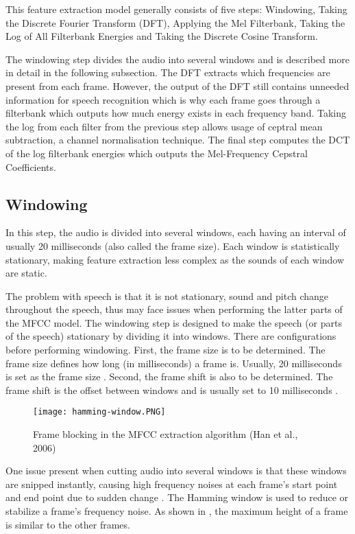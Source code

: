 This feature extraction model generally consists of five steps: Windowing, Taking the Discrete Fourier Transform (DFT), Applying the Mel Filterbank, Taking the Log of All Filterbank Energies and Taking the Discrete Cosine Transform.

The windowing step divides the audio into several windows and is described more in detail in the following subsection. The DFT extracts which frequencies are present from each frame. However, the output of the DFT still contains unneeded information for speech recognition which is why each frame goes through a filterbank which outputs how much energy exists in each frequency band. Taking the log from each filter from the previous step allows usage of ceptral mean subtraction, a channel normalisation technique. The final step computes the DCT of the log filterbank energies which outputs the Mel-Frequency Cepstral Coefficients.

\subsection{Windowing}
In this step, the audio is divided into several windows, each having an interval of usually 20 milliseconds (also called the frame size). Each window is statistically stationary, making feature extraction less complex as the sounds of each window are static.

The problem with speech is that it is not stationary, sound and pitch change throughout the speech, thus may face issues when performing the latter parts of the MFCC model. The windowing step is designed to make the speech (or parts of the speech) stationary by dividing it into windows. There are configurations before performing windowing. First, the frame size is to be determined. The frame size defines how long (in milliseconds) a frame is. Usually, 20 milliseconds is set as the frame size \cite{han:mfcc-extraction:2006}. Second, the frame shift is also to be determined. The frame shift is the offset between windows \cite{agustin:2014:SOM} and is usually set to 10 milliseconds \cite{han:mfcc-extraction:2006}.

\begin{figure}[h]
    \centering
    \texttt{[image: hamming-window.PNG]}
    \caption{Frame blocking in the MFCC extraction algorithm (Han et al., 2006)}
    \label{fig:hamming-window}
\end{figure}

One issue present when cutting audio into several windows is that these windows are snipped instantly, causing high frequency noises at each frame's start point and end point due to sudden change \cite{han:mfcc-extraction:2006}. The Hamming window is used to reduce or stabilize a frame's frequency noise. As shown in , the maximum height of a frame is similar to the other frames.

